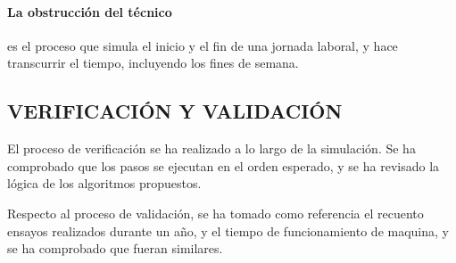 \paragraph{La obstrucción del técnico}
es el proceso que simula el inicio y el fin de una jornada laboral,
y hace transcurrir el tiempo, incluyendo los fines de semana.

\subsection{VERIFICACIÓN Y VALIDACIÓN}

El proceso de verificación se ha realizado a lo largo de la simulación.
Se ha comprobado que los pasos se ejecutan en el orden esperado,
y se ha revisado la lógica de los algoritmos propuestos.

Respecto al proceso de validación,
se ha tomado como referencia el recuento ensayos realizados durante un año,
y el tiempo de funcionamiento de maquina, y se ha comprobado que fueran similares. 
